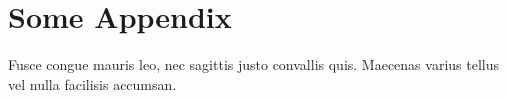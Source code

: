 \chapter{Some Appendix}

Fusce congue mauris leo, nec sagittis justo convallis quis. Maecenas varius tellus vel nulla facilisis accumsan.
